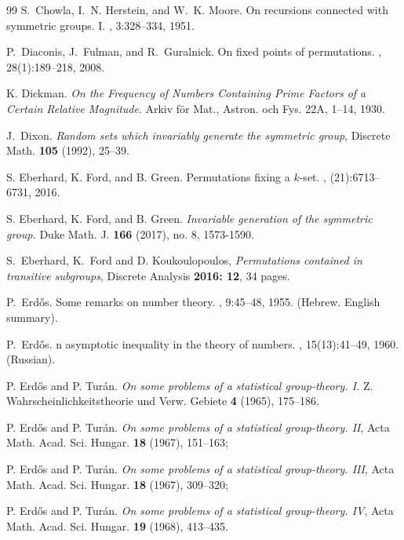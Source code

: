 \documentclass[10pt]{article}
\renewcommand{\(}{\left(}
\renewcommand{\)}{\right)}
\begin{document}
\begin{thebibliography}{99}
{\sc S.~Chowla, I.~N. Herstein, and W.~K. Moore}.
\newblock On recursions connected with symmetric groups. {I}.
, 3:328--334, 1951.
%
%
%
%
%
%
%
%

{\sc P.~Diaconis, J.~Fulman, and R.~Guralnick}.
\newblock On fixed points of permutations.
, 28(1):189--218, 2008.

{\sc K. Dickman}.  \emph{On the Frequency of Numbers Containing Prime Factors of a Certain Relative Magnitude}. Arkiv f\"or Mat., Astron. och Fys. 22A, 1--14, 1930.


 {\sc J.~Dixon}. \emph{Random sets which invariably generate the symmetric group}, Discrete Math. \textbf
{105} (1992), 25--39.


{\sc S. Eberhard, K. Ford, and B. Green}.
\newblock Permutations fixing a {$k$}-set.
, (21):6713--6731, 2016.

{\sc S. Eberhard, K. Ford, and B. Green}.
\newblock \emph{Invariable generation of the symmetric group.}
\newblock Duke Math. J. {\bf 166} (2017), no. 8, 1573-1590.

{\sc S.~Eberhard, K.~Ford and D. Koukoulopoulos},
\emph{Permutations contained in transitive subgroups},
Discrete Analysis {\bf 2016: 12}, 34 pages. 

{\sc P.~Erd{\H{o}}s}.
\newblock Some remarks on number theory.
, 9:45--48, 1955.
\newblock (Hebrew. English summary).

{\sc P.~Erd{\H{o}}s}.
n asymptotic inequality in the theory of numbers.
, 15(13):41--49, 1960.
\newblock (Russian).

{\sc P. Erd{\H o}s and P. Tur{\' a}n}.
\emph{On some problems of a statistical group-theory. I.} Z. Wahrscheinlichkeitstheorie und Verw. Gebiete  {\bf 4}  (1965), 175--186.
%
%
 
 
{\sc P. Erd{\H o}s and P. Tur{\' a}n}.
 \emph{On some problems of a statistical group-theory. II},
 Acta Math. Acad. Sci. Hungar.  {\bf 18}  (1967), 151--163;
 
 {\sc P. Erd{\H o}s and P. Tur{\' a}n}.
 \emph{On some problems of a statistical group-theory. III},
 Acta Math. Acad. Sci. Hungar.  {\bf 18}  (1967), 309--320;
 
 {\sc P. Erd{\H o}s and P. Tur{\' a}n}.
 \emph{On some problems of a statistical group-theory. IV},
 Acta Math. Acad. Sci. Hungar.  {\bf 19}  (1968), 413--435.
		

\end{thebibliography}
\end{document}
